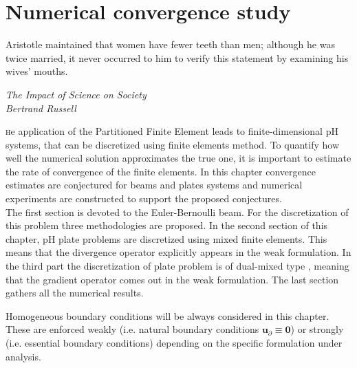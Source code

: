 \chapter{Numerical convergence study}\label{ch:conv}

\epigraph{Aristotle maintained that women have fewer teeth than men; although he was twice married, it never occurred to him to verify this statement by examining his wives' mouths.}{\textit{The Impact of Science on Society \\ Bertrand Russell}}

\minitoc

\lettrine{\color{theme}{T}}he application of the Partitioned Finite Element leads to finite-dimensional pH systems, that can be discretized using finite elements method. To quantify how well the numerical solution approximates the true one, it is important to estimate the rate of convergence of the finite elements. In this chapter convergence estimates are conjectured for beams and plates systems and numerical experiments are constructed to support the proposed conjectures. \\

The first section is devoted to the Euler-Bernoulli beam. For the discretization of this problem three methodologies are proposed. In the second section of this chapter, pH plate problems are discretized using mixed finite elements. This means that the divergence operator explicitly appears in the weak formulation.  In the third part the discretization of plate problem is of dual-mixed type \cite{arnold1990intro}, meaning that the gradient operator comes out in the weak formulation. The last section gathers all the numerical results. \\

\begin{remark}
Homogeneous boundary conditions will be always considered in this chapter. These are enforced weakly  (i.e. natural boundary conditions $\bm{u}_\partial \equiv \bm{0}$) or strongly (i.e. essential boundary conditions) depending on the specific formulation under analysis.
\end{remark}



